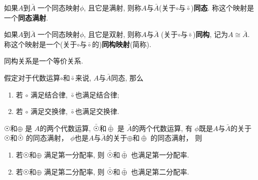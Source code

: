 \begin{Definition}[同态满射、同态]
如果$A$到$\bar{A}\;${}\;一个同态映射$\phi$, 且它是满射, 则称$A$与$\bar{A}$\;(关于$\circ$与$\bar{\circ}$)\textbf{同态}. 称这个映射是一个\textbf{同态满射}.
\end{Definition}


\begin{Definition}[同构映射、同构]
如果$A$到$\bar{A}\;${}\;一个同态映射$\phi$, 且它是双射, 则称$A$与$\bar{A}\;$(关于$\circ$与$\bar{\circ}$)\textbf{同构}, 记为$A \cong
 \bar{A}$. 称这个映射是一个(关于$\circ$与$\bar{\circ}$的)\textbf{同构映射}(简称).
\end{Definition}

\begin{Proposition}
同构关系是一个等价关系.
\end{Proposition}


\begin{Theorem}
假定对于代数运算$\circ$和$\bar{\circ}$来说, $A$与$\bar{A}$同态, 那么
\begin{enumerate}[(1)]
\item 若 $\circ$ 满足结合律, $\bar{\circ}$也满足结合律;
\item 若 $\circ$ 满足交换律, $\bar{\circ}$也满足交换律.
\end{enumerate}
\end{Theorem}

\begin{Theorem}
$ \astrosun $和$ \oplus $ 是 $A$的两个代数运算, 
$ \bar{\astrosun} $和$\bar{\oplus} $ 是 $\bar{A}$的两个代数运算,
有
$\phi$既是$A$与$\bar{A}$的关于$ \astrosun $和$\bar{\astrosun}$ 的同态满射，
$\phi$也是$A$与$\bar{A}$的关于$ \oplus $和$\bar{\oplus}$ 的同态满射，
则 
\begin{enumerate}[(1)]
\item 若$ \astrosun$和$ \oplus $ 满足第一分配率, 则 $ \bar{\astrosun} $和$\bar{\oplus} $ 也满足第一分配率.
\item 若$ \astrosun$和$\oplus $ 满足第二分配率, 则 $ \bar{\astrosun} $和$\bar{\oplus} $ 也满足第二分配率.
\end{enumerate}
\end{Theorem}

